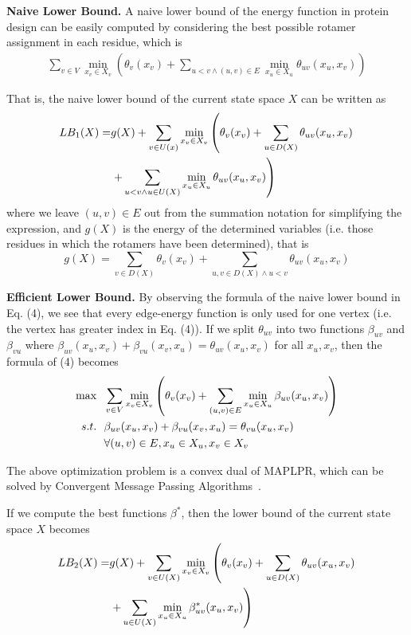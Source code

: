 \noindent\textbf{Naive Lower Bound.}
A naive lower bound of the energy function in protein design can be easily computed by considering the best possible rotamer assignment in each residue, which is
\begin{align}
\sum_{v\in V}\min_{x_v\in X_v}\left(\theta_v(x_v)+\sum_{u<v\wedge(u,v)\in E}\min_{x_u\in X_u}\theta_{uv}(x_u,x_v)\right)
\end{align}

That is, the naive lower bound of the current state space $X$ can be written as
\begin{align}
LB_1(X)=&g(X)+\sum_{v\in U(x)}\min_{x_v\in X_v}\left(\theta_v(x_v)+\sum_{u\in D(X)}\theta_{uv}(x_u,x_v)\notag\right. \\
&\left.+\sum_{u<v\wedge u\in U(X)}\min_{x_u\in X_u}\theta_{uv}(x_u,x_v)\right)
\end{align}
where we leave $(u,v)\in E$ out from the summation notation for simplifying the expression, and $g(X)$ is the energy of the determined variables (i.e. those residues in which the rotamers have been determined), that is
\[
g(X) = \sum_{v\in D(X)}\theta_v(x_v)+\sum_{u,v\in D(X)\wedge u<v}\theta_{uv}(x_u,x_v)
\]

\noindent\textbf{Efficient Lower Bound.} By observing the formula of the naive lower bound in Eq. (4), we see that every edge-energy function is only used for one vertex (i.e. the vertex has greater index in Eq. (4)). If we split $\theta_{uv}$ into two functions $\beta_{uv}$ and $\beta_{vu}$ where $\beta_{uv}(x_u,x_v)+\beta_{vu}(x_v,x_u)=\theta_{uv}(x_u,x_v)$ for all $x_u,x_v$, then the formula of (4) becomes
\begin{align}
\max & \ \ \sum_{v\in V}\min_{x_v\in X_v}\left(\theta_v(x_v)+\sum_{(u,v)\in E}\min_{x_u\in X_u}\beta_{uv}(x_u,x_v)\right) \\
s.t. & \ \ \beta_{uv}(x_u,x_v)+\beta_{vu}(x_v,x_u)=\theta_{vu}(x_u,x_v) \notag \\
& \ \ \forall (u,v)\in E,x_u\in X_u,x_v\in X_v \notag
\end{align}

The above optimization problem is a convex dual of MAPLPR, which can be solved by Convergent Message Passing Algorithms~\cite[]{globerson2008fixing}.

If we compute the best functions $\beta^*$, then the lower bound of the current state space $X$ becomes
\begin{align}
LB_2(X)=&g(X)+\sum_{v\in U(X)}\min_{x_v\in X_v}\left(\theta_v(x_v)+\sum_{u\in D(X)}\theta_{uv}(x_u,x_v)\right. \notag \\
&\left.+\sum_{u\in U(X)}\min_{x_u\in X_u}\beta_{uv}^*(x_u,x_v)\right)
\end{align}

